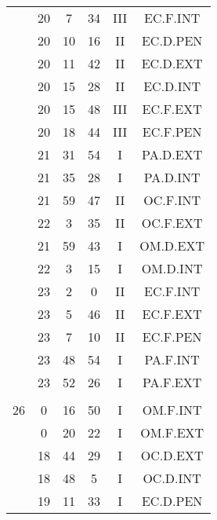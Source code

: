 \documentclass[12pt, a4paper]{article}
\begin{document}
\begin{multicols}{3}
{\begin{tabular}{c c c c c c}
	 	 	 	 & 20 & 7 & 34 & III & EC.F.INT\\%
	 	 	 	 & 20 & 10 & 16 & II & EC.D.PEN\\%
	 	 	 	 & 20 & 11 & 42 & II & EC.D.EXT\\%
	 	 	 	 & 20 & 15 & 28 & II & EC.D.INT\\%
	 	 	 	 & 20 & 15 & 48 & III & EC.F.EXT\\%
	 	 	 	 & 20 & 18 & 44 & III & EC.F.PEN\\%
	 	 	 	 & 21 & 31 & 54 & I & PA.D.EXT\\%
	 	 	 	 & 21 & 35 & 28 & I & PA.D.INT\\%
	 	 	 	 & 21 & 59 & 47 & II & OC.F.INT\\%
	 	 	 	 & 22 & 3 & 35 & II & OC.F.EXT\\%
	 	 	 	 & 21 & 59 & 43 & I & OM.D.EXT\\%
	 	 	 	 & 22 & 3 & 15 & I & OM.D.INT\\%
	 	 	 	 & 23 & 2 & 0 & II & EC.F.INT\\%
	 	 	 	 & 23 & 5 & 46 & II & EC.F.EXT\\%
	 	 	 	 & 23 & 7 & 10 & II & EC.F.PEN\\%
	 	 	 	 & 23 & 48 & 54 & I & PA.F.INT\\%
	 	 	 	 & 23 & 52 & 26 & I & PA.F.EXT\\%
	 	 	 	 & & & & & \\%
	 	 	 	26 & 0 & 16 & 50 & I & OM.F.INT\\%
	 	 	 	 & 0 & 20 & 22 & I & OM.F.EXT\\%
	 	 	 	 & 18 & 44 & 29 & I & OC.D.EXT\\%
	 	 	 	 & 18 & 48 & 5 & I & OC.D.INT\\%
	 	 	 	 & 19 & 11 & 33 & I & EC.D.PEN\\%

\end{tabular}}
\end{multicols}
\end{document}
